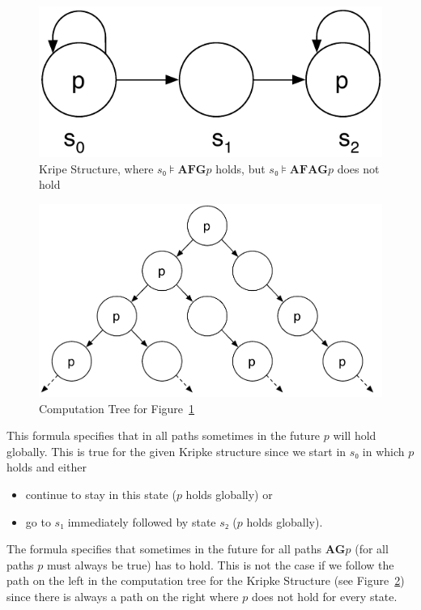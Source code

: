 \documentclass[a4paper, 12pt]{article}
\begin{document}
\begin{figure}[htbp]
    \centering
        \includegraphics[width=.4\textwidth]
            {Figures/Kripke Structure Exercise 6.pdf}
    \caption{Kripe Structure, where $s₀⊧\mathbf{AFG} p$ holds, but
             $s₀⊧\mathbf{AFAG} p$ does not hold}
    \label{figure:Kripke_Structure_Exercise_6}
\end{figure}

\begin{figure}[htbp]
    \centering
        \includegraphics[width=.7\textwidth]
            {Figures/Computation Tree Exercise 6.pdf}
    \caption{Computation Tree for
             Figure~\ref{figure:Kripke_Structure_Exercise_6}}
    \label{figure:Computation_Tree_Exercise_6}
\end{figure}

\begin{description}[style=multiline, leftmargin=3cm]

    \item[$s₀⊧\mathbf{AF}(\mathbf{G} p)$] This formula specifies that in all
    paths sometimes in the future $p$ will hold globally. This is true for the
    given Kripke structure since we start in $s₀$ in which $p$ holds and either

        \begin{itemize}

            \item continue to stay in this state ($p$ holds globally) or

            \item go to $s₁$ immediately followed by state $s₂$ ($p$ holds
            globally).

        \end{itemize}

    \item[$s₀⊧\mathbf{AF}(\mathbf{AG} p)$] The formula specifies that
    sometimes in the future for all paths $\mathbf{AG} p$ (for all paths $p$
    must always be true) has to hold. This is not the case if we follow the
    path on the left in the computation tree for the Kripke Structure (see
    Figure~\ref{figure:Computation_Tree_Exercise_6}) since there is always a
    path on the right where $p$ does not hold for every state.

\end{description}
\end{document}
